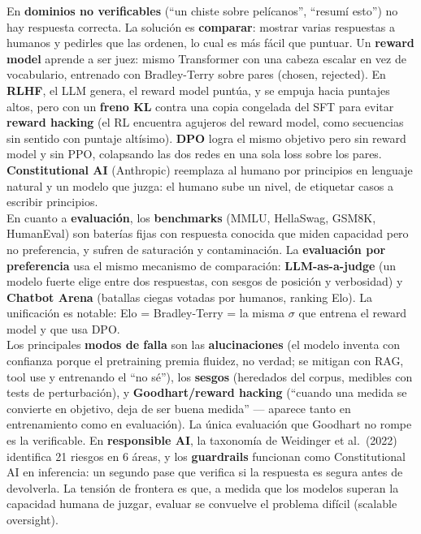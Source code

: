 \documentclass[11pt,a4paper]{article}
\begin{document}
En \textbf{dominios no verificables} (``un chiste sobre pel\'icanos'', ``resum\'i esto'') no hay respuesta correcta. La soluci\'on es \textbf{comparar}: mostrar varias respuestas a humanos y pedirles que las ordenen, lo cual es m\'as f\'acil que puntuar. Un \textbf{reward model} aprende a ser juez: mismo Transformer con una cabeza escalar en vez de vocabulario, entrenado con Bradley-Terry sobre pares (chosen, rejected). En \textbf{RLHF}, el LLM genera, el reward model punt\'ua, y se empuja hacia puntajes altos, pero con un \textbf{freno KL} contra una copia congelada del SFT para evitar \textbf{reward hacking} (el RL encuentra agujeros del reward model, como secuencias sin sentido con puntaje alt\'isimo). \textbf{DPO} logra el mismo objetivo pero sin reward model y sin PPO, colapsando las dos redes en una sola loss sobre los pares. \textbf{Constitutional AI} (Anthropic) reemplaza al humano por principios en lenguaje natural y un modelo que juzga: el humano sube un nivel, de etiquetar casos a escribir principios. \\[1ex]

En cuanto a \textbf{evaluaci\'on}, los \textbf{benchmarks} (MMLU, HellaSwag, GSM8K, HumanEval) son bater\'ias fijas con respuesta conocida que miden capacidad pero no preferencia, y sufren de saturaci\'on y contaminaci\'on. La \textbf{evaluaci\'on por preferencia} usa el mismo mecanismo de comparaci\'on: \textbf{LLM-as-a-judge} (un modelo fuerte elige entre dos respuestas, con sesgos de posici\'on y verbosidad) y \textbf{Chatbot Arena} (batallas ciegas votadas por humanos, ranking Elo). La unificaci\'on es notable: Elo = Bradley-Terry = la misma $\sigma$ que entrena el reward model y que usa DPO. \\[1ex]

Los principales \textbf{modos de falla} son las \textbf{alucinaciones} (el modelo inventa con confianza porque el pretraining premia fluidez, no verdad; se mitigan con RAG, tool use y entrenando el ``no s\'e''), los \textbf{sesgos} (heredados del corpus, medibles con tests de perturbaci\'on), y \textbf{Goodhart/reward hacking} (``cuando una medida se convierte en objetivo, deja de ser buena medida'' --- aparece tanto en entrenamiento como en evaluaci\'on). La \'unica evaluaci\'on que Goodhart no rompe es la verificable. En \textbf{responsible AI}, la taxonom\'ia de Weidinger et al.\ (2022) identifica 21 riesgos en 6 \'areas, y los \textbf{guardrails} funcionan como Constitutional AI en inferencia: un segundo pase que verifica si la respuesta es segura antes de devolverla. La tensi\'on de frontera es que, a medida que los modelos superan la capacidad humana de juzgar, evaluar se convuelve el problema dif\'icil (scalable oversight). \\[1ex]
\end{document}

